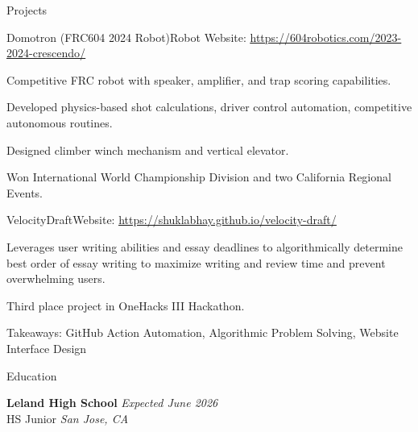 \documentclass[
  11pt, %
]{public/resume/resume} %
\begin{document}
\begin{rSection}{Projects}
\begin{rSubsection}{Domotron (FRC604 2024 Robot)}{}{Robot Website: \underline{\href{https://604robotics.com/2023-2024-crescendo/}{https://604robotics.com/2023-2024-crescendo/}}}{}
    \item Competitive FRC robot with speaker, amplifier, and trap scoring capabilities.
        
    \item Developed physics-based shot calculations, driver control automation, competitive autonomous routines.
        
    \item Designed climber winch mechanism and vertical elevator.
        
    \item Won International World Championship Division and two California Regional Events.
        
  \end{rSubsection}
      
  \begin{rSubsection}{VelocityDraft}{}{Website: \underline{\href{https://shuklabhay.github.io/velocity-draft/}{https://shuklabhay.github.io/velocity-draft/}}}{}
       
    \item Leverages user writing abilities and essay deadlines to algorithmically determine best order of essay writing to maximize writing and review time and prevent overwhelming users.
        
    \item Third place project in OneHacks III Hackathon.
        
    \item Takeaways: GitHub Action Automation, Algorithmic Problem Solving, Website Interface Design
        
  \end{rSubsection}
      
	
\end{rSection}
    

\begin{rSection}{Education}
	
	\textbf{Leland High School} \hfill \textit{Expected June 2026} \\
	HS Junior \hfill \textit{San Jose, CA}
	
\end{rSection}

\end{document}
